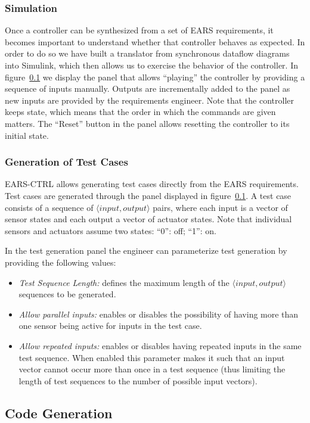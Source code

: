 \subsubsection{Simulation}

Once a controller can be synthesized from a set of EARS requirements, it becomes
important to understand whether that controller behaves as expected. In order to
do so we have built a translator from synchronous dataflow diagrams into
\textsf{Simulink}, which then allows us to exercise the behavior of the
controller. In figure~\ref{} we display the panel that allows ``playing'' the
controller by providing a sequence of inputs manually. Outputs are incrementally
added to the panel as new inputs are provided by the requirements engineer.
Note that the controller keeps state, which means that the order in which the commands are given matters.
The ``Reset'' button in the panel allows resetting the controller to its initial
state.

\subsubsection{Generation of Test Cases}

\textsf{EARS-CTRL} allows generating test cases directly from the EARS
requirements. Test cases are generated through the panel displayed in
figure~\ref{}. A test case consists of a sequence of $\langle
  input, output \rangle$ pairs, where each input is a vector of sensor states
  and each output a vector of actuator states. Note that individual sensors and
  actuators assume two states: ``0'': off; ``1'': on.

In the test generation panel the engineer can parameterize test generation by
providing the following values:
\begin{itemize}
  \item \emph{Test Sequence Length:} defines the maximum length of the $\langle
  input, output \rangle$ sequences to be generated.
  \item \emph{Allow parallel inputs:} enables or disables the possibility of
  having more than one sensor being active for inputs in the test case.
  \item \emph{Allow repeated inputs:} enables or disables having repeated inputs
  in the same test sequence. When enabled this parameter makes it such that
  an input vector cannot occur more than once in a test sequence (thus limiting
  the length of test sequences to the number of possible input vectors).
\end{itemize}


\subsection{Code Generation}